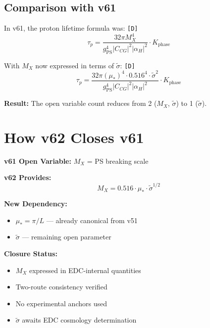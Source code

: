 \documentclass[11pt,a4paper]{article}
\newcommand{\tagD}{\textcolor{green!50!black}{\texttt{[D]}}}
\theoremstyle{definition}
\begin{document}
\subsection{Comparison with v61}
\label{subsec:v61-comparison}

In v61, the proton lifetime formula was: \tagD{}
\begin{equation}
\label{eq:tau-p-v61}
\tau_p = \frac{32\pi M_X^4}{g_{\text{PS}}^4 |C_{CG}|^2 |\alpha_H|^2} \cdot K_{\text{phase}}
\end{equation}

With $M_X$ now expressed in terms of $\tilde{\sigma}$: \tagD{}
\begin{equation}
\label{eq:tau-p-with-mx}
\tau_p = \frac{32\pi (\mu_*)^4 \cdot 0.516^4 \cdot \tilde{\sigma}^2}{g_{\text{PS}}^4 |C_{CG}|^2 |\alpha_H|^2} \cdot K_{\text{phase}}
\end{equation}

\textbf{Result:} The open variable count reduces from 2 ($M_X$, $\tilde{\sigma}$) to 1 ($\tilde{\sigma}$).

\section{How v62 Closes v61}
\label{sec:closes-v61}

\begin{canonbox}[v62 $\to$ v61 Closure]
\textbf{v61 Open Variable:} $M_X$ = PS breaking scale

\textbf{v62 Provides:}
\begin{equation}
\label{eq:v62-provides}
M_X = 0.516 \cdot \mu_* \cdot \tilde{\sigma}^{1/2}
\end{equation}

\textbf{New Dependency:}
\begin{itemize}
  \item $\mu_* = \pi/L$ --- already canonical from v51
  \item $\tilde{\sigma}$ --- remaining open parameter
\end{itemize}

\textbf{Closure Status:}
\begin{itemize}
  \item[$\checkmark$] $M_X$ expressed in EDC-internal quantities
  \item[$\checkmark$] Two-route consistency verified
  \item[$\checkmark$] No experimental anchors used
  \item[$\circ$] $\tilde{\sigma}$ awaits EDC cosmology determination
\end{itemize}
\end{canonbox}
\end{document}
